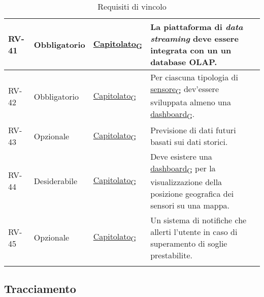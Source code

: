 \begin{longtable}{|>{\centering\arraybackslash}m{}|>{\centering\arraybackslash}m{}|>{\centering\arraybackslash}m{}|>{\centering\arraybackslash}m{}|}
	RV-41           & Obbligatorio        & \href{https://7last.github.io/docs/rtb/documentazione-interna/glossario\#capitolato}{Capitolato\textsubscript{G}} & La piattaforma di \textit{data streaming} deve essere integrata con un un database OLAP.                                                                                                                                                                                                \\\hline
	RV-42           & Obbligatorio        & \href{https://7last.github.io/docs/rtb/documentazione-interna/glossario\#capitolato}{Capitolato\textsubscript{G}} & Per ciascuna tipologia di \href{https://7last.github.io/docs/rtb/documentazione-interna/glossario\#sensore}{sensore\textsubscript{G}} dev'essere sviluppata almeno una \href{https://7last.github.io/docs/rtb/documentazione-interna/glossario\#dashboard}{dashboard\textsubscript{G}}. \\\hline
	RV-43           & Opzionale           & \href{https://7last.github.io/docs/rtb/documentazione-interna/glossario\#capitolato}{Capitolato\textsubscript{G}} & Previsione di dati futuri basati sui dati storici.                                                                                                                                                                                                                                      \\\hline
	RV-44           & Desiderabile        & \href{https://7last.github.io/docs/rtb/documentazione-interna/glossario\#capitolato}{Capitolato\textsubscript{G}} & Deve esistere una \href{https://7last.github.io/docs/rtb/documentazione-interna/glossario\#dashboard}{dashboard\textsubscript{G}} per la visualizzazione della posizione geografica dei sensori su una mappa.                                                                           \\\hline
	RV-45           & Opzionale           & \href{https://7last.github.io/docs/rtb/documentazione-interna/glossario\#capitolato}{Capitolato\textsubscript{G}} & Un sistema di notifiche che allerti l'utente in caso di superamento di soglie prestabilite.                                                                                                                                                                                             \\\hline
	\caption{Requisiti di vincolo}
	\label{table:3}
\end{longtable}


\subsection{Tracciamento}
